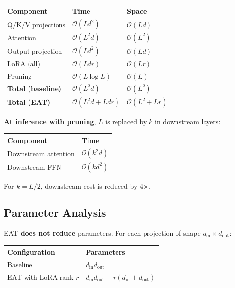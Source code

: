 \begin{table}[H]
\centering
\small
\begin{tabular}{lll}
\toprule
\textbf{Component} & \textbf{Time} & \textbf{Space} \\
\midrule
Q/K/V projections & $\mathcal{O}(L d^2)$ & $\mathcal{O}(L d)$ \\
Attention & $\mathcal{O}(L^2 d)$ & $\mathcal{O}(L^2)$ \\
Output projection & $\mathcal{O}(L d^2)$ & $\mathcal{O}(L d)$ \\
LoRA (all) & $\mathcal{O}(L d r)$ & $\mathcal{O}(L r)$ \\
Pruning & $\mathcal{O}(L \log L)$ & $\mathcal{O}(L)$ \\
\textbf{Total (baseline)} & $\mathcal{O}(L^2 d)$ & $\mathcal{O}(L^2)$ \\
\textbf{Total (EAT)} & $\mathcal{O}(L^2 d + L d r)$ & $\mathcal{O}(L^2 + L r)$ \\
\bottomrule
\end{tabular}
\end{table}

\textbf{At inference with pruning}, $L$ is replaced by $k$ in downstream layers:

\begin{table}[H]
\centering
\small
\begin{tabular}{ll}
\toprule
\textbf{Component} & \textbf{Time} \\
\midrule
Downstream attention & $\mathcal{O}(k^2 d)$ \\
Downstream FFN & $\mathcal{O}(k d^2)$ \\
\bottomrule
\end{tabular}
\end{table}

For $k = L / 2$, downstream cost is reduced by 4$\times$.

\subsection{Parameter Analysis}

EAT \textbf{does not reduce} parameters. For each projection of shape 
$d_\text{in} \times d_\text{out}$:

\begin{table}[H]
\centering
\small
\begin{tabular}{ll}
\toprule
\textbf{Configuration} & \textbf{Parameters} \\
\midrule
Baseline & $d_\text{in} d_\text{out}$ \\
EAT with LoRA rank $r$ & $d_\text{in} d_\text{out} + r(d_\text{in} + d_\text{out})$ \\
\bottomrule
\end{tabular}
\end{table}

